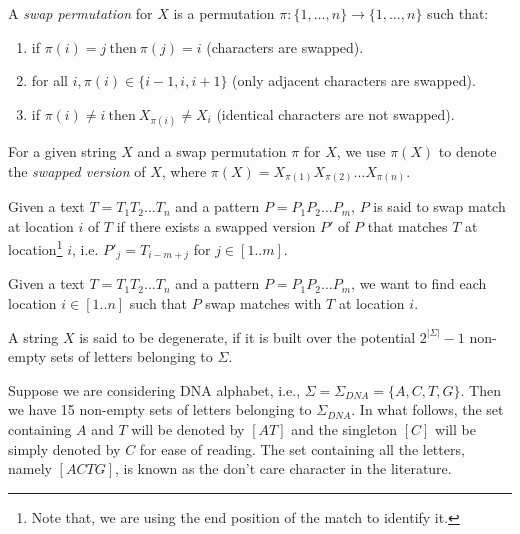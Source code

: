 \documentclass{llncs}
\begin{document}
\begin{definition}
A \emph{swap permutation} for $X$ is a permutation
$\pi: \{1,\ldots,n\}\rightarrow \{1,\ldots,n\}$ such that:
\begin{enumerate}
\item if $\pi(i) = j~ \text{then}~\pi(j) = i$ (characters are swapped).
\item for all $i, \pi(i)\in \{i-1,i,i+1\}$ (only adjacent characters are swapped).
\item if $\pi(i) \neq i ~\text{then}~ X_{\pi(i)} \neq X_i$ (identical characters are not
swapped).
\end{enumerate}
\end{definition}

For a given string $X$ and a swap permutation $\pi$ for $X$, we use
$\pi(X)$ to denote the \emph{swapped version} of $X$, where
$\pi(X)=X_{\pi(1)} X_{\pi(2)} \ldots X_{\pi(n)}$.

\begin{definition}
Given a text $T = T_1 T_2 \ldots T_n$ and a pattern $P = P_1 P_2
\ldots P_m$, $P$ is said to swap match at location $i$ of $T$
if there exists a swapped version $P'$ of $P$ that matches $T$ at
location\footnote{Note that, we are using the end position of the
match to identify it.} $i$, i.e. $P'_j = T_{i-m +j}$ for
$j\in[1..m]$.
\end{definition}



\begin{swap}
Given a text $T = T_1 T_2 \ldots T_n$ and a pattern $P = P_1 P_2
\ldots P_m$, we want to find each location $i\in[1..n]$ such that
$P$ swap matches with $T$ at location $i$.
\end{swap}

\begin{definition}\label{Def_Degenerate_String}
A string $X$ is said to be degenerate, if it is built over the
potential $2^{|\Sigma|}-1$ non-empty sets of letters belonging to
$\Sigma$.
\end{definition}


\begin{example}
Suppose we are considering DNA alphabet, i.e., $\Sigma = \Sigma_{DNA}=\{A,C,T,G\}$. Then we have 15 non-empty sets of letters belonging to $\Sigma_{DNA}$. In what follows, the set containing $A$ and $T$ will be denoted by $[AT]$ and the singleton $[C]$ will be simply denoted by $C$ for ease of reading. The set containing all the letters, namely $[ACTG]$, is known as the don't care character in the literature.
\end{example}
\end{document}
